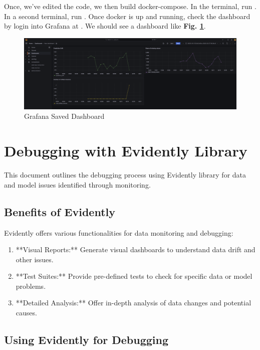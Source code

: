 \documentclass[letterpaper,12pt,notitlepage,twoside]{report}
\begin{document}
Once, we've edited the code, we then build docker-compose. In the terminal, run . In a second terminal,  run . Once docker is up and running, check the dashboard by login into Grafana at . We should see a dashboard like \textbf{Fig. \ref{fig:15}}.
\begin{figure}[h]
	\centering
	\includegraphics[width=\textwidth]{Images/grafana-dashboard.png}
	\caption{Grafana Saved Dashboard}
	\label{fig:15}
\end{figure}
\FloatBarrier

\section{Debugging with Evidently Library}
This document outlines the debugging process using Evidently library for data and model issues identified through monitoring.

\subsection{Benefits of Evidently}

Evidently offers various functionalities for data monitoring and debugging:

\begin{enumerate}
  \item **Visual Reports:** Generate visual dashboards to understand data drift and other issues.
  \item **Test Suites:** Provide pre-defined tests to check for specific data or model problems.
  \item **Detailed Analysis:** Offer in-depth analysis of data changes and potential causes.
\end{enumerate}

\subsection{Using Evidently for Debugging}
\end{document}
